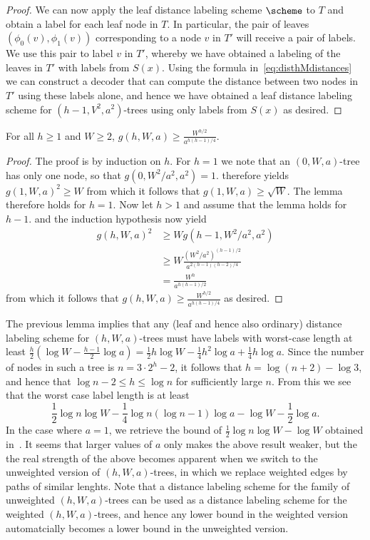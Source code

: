 \begin{proof}
We can now apply the leaf distance labeling scheme $\scheme$ to $T$ and obtain a label for each leaf node in $T$. In particular, the pair of leaves $(\phi_0(v),\phi_1(v))$ corresponding to a node $v$ in $T'$ will receive a pair of labels. We use this pair to label $v$ in $T'$, whereby we have obtained a labeling of the leaves in $T'$ with labels from $S(x)$. Using the formula in~\eqref{eq:disthMdistances} we can construct a decoder that can compute the distance between two nodes in $T'$ using these labels alone, and hence we have obtained a leaf distance labeling scheme for $(h-1,V^2,a^2)$-trees using only labels from $S(x)$ as desired.
\end{proof}

\begin{lemma} \label{lemm:distancehM2}
For all $h\geq 1$ and $W\geq 2$, $g(h,W,a)\geq \frac{W^{h/2}}{a^{h(h-1)/4}}$.
\end{lemma}
\begin{proof}
The proof is by induction on $h$. For $h=1$ we note that an $(0,W,a)$-tree has only one node, so that $g(0,W^2/a^2,a^2)=1$.  therefore yields $g(1,W,a)^2\geq W$ from which it follows that $g(1,W,a)\geq \sqrt{W}$. The lemma therefore holds for $h=1$. Now let $h>1$ and assume that the lemma holds for $h-1$.  and the induction hypothesis now yield
\begin{align*}
g(h,W,a)^2 &\geq Wg(h-1,W^2/a^2,a^2) \\
 & \geq W  \frac{(W^2/a^2)^{(h-1)/2}}{a^{2(h-1)(h-2)/4}}  \\
 &= \frac{W^h}{a^{h(h-1)/2}}
\end{align*}
from which it follows that $g(h,W,a)\geq  \frac{W^{h/2}}{a^{h(h-1)/4}}$ as desired.
\end{proof}

The previous lemma implies that any (leaf and hence also ordinary) distance labeling scheme for $(h,W,a)$-trees must have labels with worst-case length at least $\frac{h}{2}(\log W-\frac{h-1}{2}\log a) = \frac{1}{2}h\log W-\frac{1}{4}h^2\log a+\frac{1}{4}h\log a$. Since the number of nodes in such a tree is $n=3\cdot 2^h-2$, it follows that $h=\log (n+2)-\log 3$, and hence that $\log n-2\leq h\leq \log n$ for sufficiently large $n$. From this we see that the worst case label length is at least 
\[
\frac{1}{2}\log n\log W-\frac{1}{4}\log n (\log n - 1)\log a-\log W -\frac{1}{2}\log a.
\]
In the case where $a=1$, we retrieve the bound of $\frac{1}{2}\log n\log W-\log W$ obtained in~\cite{gavoillepelegperennesraz}. It seems that larger values of $a$ only makes the above result weaker, but the the real strength of the above becomes apparent when we switch to the unweighted version of $(h,W,a)$-trees, in which we replace weighted edges by paths of similar lenghts. Note that a distance labeling scheme for the family of unweighted $(h,W,a)$-trees can be used as a distance labeling scheme for the weighted $(h,W,a)$-trees, and hence any lower bound in the weighted version automatcially becomes a lower bound in the unweighted version.

